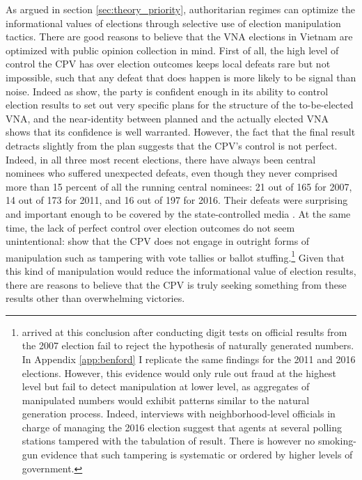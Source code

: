 \documentclass[12pt]{article}
\newcommand{\1}{\mathbbm{1}}
\begin{document}
As argued in section \ref{sec:theory_priority}, authoritarian regimes can optimize the informational values of elections through selective use of election manipulation tactics. There are good reasons to believe that the VNA elections in Vietnam are optimized with public opinion collection in mind. First of all, the high level of control the CPV has over election outcomes keeps local defeats rare but not impossible, such that any defeat that does happen is more likely to be signal than noise. Indeed as \cite{MaleskySchuler2011} show, the party is confident enough in its ability to control election results to set out very specific plans for the structure of the to-be-elected VNA, and the near-identity between planned and the actually elected VNA shows that its confidence is well warranted. However, the fact that the final result detracts slightly from the plan suggests that the CPV's control is not perfect. Indeed, in all three most recent elections, there have always been central nominees who suffered unexpected defeats, even though they never comprised more than 15 percent of all the running central nominees: 21 out of 165 for 2007, 14 out of 173 for 2011, and 16 out of 197 for 2016. Their defeats were surprising and important enough to be covered by the state-controlled media \citep[e.g][]{vov2016, laodong2016}. At the same time, the lack of perfect control over election outcomes do not seem unintentional: \cite{MaleskySchuler2011} show that the CPV does not engage in outright forms of manipulation such as tampering with vote tallies or ballot stuffing.\footnote{\cite{MaleskySchuler2011} arrived at this conclusion after conducting digit tests on official results from the 2007 election fail to reject the hypothesis of naturally generated numbers. In Appendix \ref{app:benford} I replicate the same findings for the 2011 and 2016 elections. However, this evidence would only rule out fraud at the highest level but fail to detect manipulation at lower level, as aggregates of manipulated numbers would exhibit patterns similar to the natural generation process. Indeed, interviews with neighborhood-level officials in charge of managing the 2016 election suggest that agents at several polling stations tampered with the tabulation of result. There is however no smoking-gun evidence that such tampering is systematic or ordered by higher levels of government.} Given that this kind of manipulation would reduce the informational value of election results, there are reasons to believe that the CPV is truly seeking something from these results other than overwhelming victories.
\end{document}
